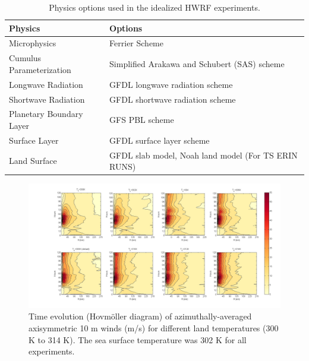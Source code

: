 \documentclass[fleqn,10pt]{wlscirep}
\begin{document}
\begin{table}[ht]
\centering
\begin{tabular}{|l|l|}
\hline
\textbf{Physics} & \textbf{Options} \\
\hline
Microphysics & Ferrier Scheme \\
\hline
Cumulus Parameterization & Simplified Arakawa and Schubert (SAS) scheme \\
\hline
Longwave Radiation & GFDL longwave radiation scheme \\
\hline
Shortwave Radiation & GFDL shortwave radiation scheme \\
\hline
Planetary Boundary Layer & GFS PBL scheme \\
\hline
Surface Layer & GFDL surface layer scheme \\
\hline
Land Surface & GFDL slab model, Noah land model (For TS ERIN RUNS)\\
\hline
\end{tabular}
\caption{Physics options used in the idealized HWRF experiments.}
\label{tab:HWRF_phy}
\end{table}

\begin{figure}[ht]
\centering
\includegraphics[width=\linewidth]{hove_temp}
\caption{Time evolution (Hovmöller diagram) of azimuthally-averaged axisymmetric 10 m winds (m/s) for different land temperatures (300 K to 314 K). The sea surface temperature was 302 K for all experiments.}
\label{fig:hove_temp}
\end{figure}
\end{document}
